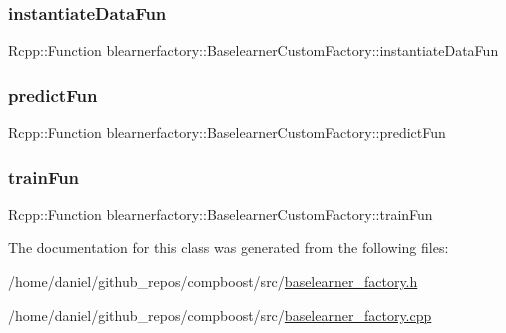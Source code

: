 \subsubsection{\texorpdfstring{instantiate\+Data\+Fun}{instantiateDataFun}}
{\footnotesize\ttfamily Rcpp\+::\+Function blearnerfactory\+::\+Baselearner\+Custom\+Factory\+::instantiate\+Data\+Fun\hspace{0.3cm}{\ttfamily [private]}}

\mbox{\label{classblearnerfactory_1_1_baselearner_custom_factory_ad7bed8ada05584d107edb2346f5d5a2b}} 
\subsubsection{\texorpdfstring{predict\+Fun}{predictFun}}
{\footnotesize\ttfamily Rcpp\+::\+Function blearnerfactory\+::\+Baselearner\+Custom\+Factory\+::predict\+Fun\hspace{0.3cm}{\ttfamily [private]}}

\mbox{\label{classblearnerfactory_1_1_baselearner_custom_factory_ab0d94b2fe7c675252255f791eab3ad7a}} 
\subsubsection{\texorpdfstring{train\+Fun}{trainFun}}
{\footnotesize\ttfamily Rcpp\+::\+Function blearnerfactory\+::\+Baselearner\+Custom\+Factory\+::train\+Fun\hspace{0.3cm}{\ttfamily [private]}}



The documentation for this class was generated from the following files\+:\begin{DoxyCompactItemize}
\item 
/home/daniel/github\+\_\+repos/compboost/src/\hyperlink{baselearner__factory_8h}{baselearner\+\_\+factory.\+h}\item 
/home/daniel/github\+\_\+repos/compboost/src/\hyperlink{baselearner__factory_8cpp}{baselearner\+\_\+factory.\+cpp}\end{DoxyCompactItemize}

